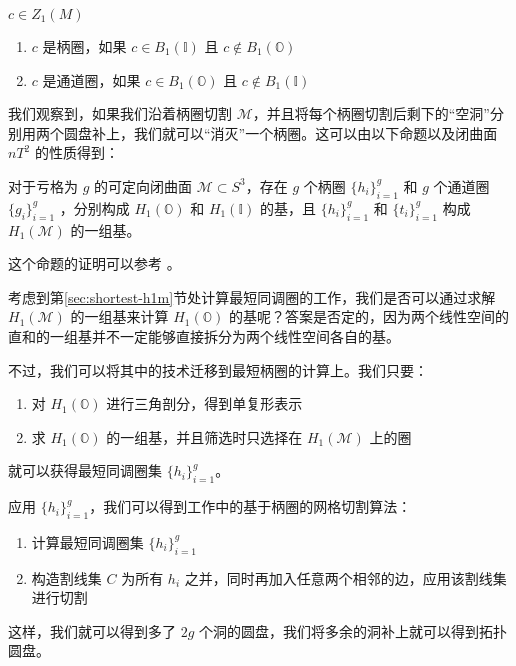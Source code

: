 \begin{definition}
    $ c \in Z_1(M) $
    \begin{enumerate}
        \item $ c $ 是柄圈，如果 $ c \in B_1(\mathbb{I}) $ 且 $ c \notin B_1(\mathbb{O}) $
        \item $ c $ 是通道圈，如果 $ c \in B_1(\mathbb{O}) $ 且 $ c \notin B_1(\mathbb{I}) $
    \end{enumerate}
\end{definition}

我们观察到，如果我们沿着柄圈切割 $ \mathcal{M} $，并且将每个柄圈切割后剩下的“空洞”分别用两个圆盘补上，我们就可以“消灭”一个柄圈。这可以由以下命题以及闭曲面 $ nT^2 $ 的性质得到：

\begin{proposition}
    对于亏格为 $ g $ 的可定向闭曲面 $ \mathcal{M} \subset S^3 $，存在 $ g $ 个柄圈 $ \{h_i\}_{i=1}^{g} $ 和 $ g $ 个通道圈 $ \{g_i\}_{i=1}^{g} $ ，分别构成 $ H_1(\mathbb{O}) $ 和 $ H_1(\mathbb{I}) $ 的基，且 $ \{h_i\}_{i=1}^{g} $ 和 $ \{t_i\}_{i=1}^{g} $ 构成 $ H_1(\mathcal{M}) $ 的一组基。
\end{proposition}

这个命题的证明可以参考 \citet{oncomputinghantun}。

考虑到第\ref{sec:shortest-h1m}节处计算最短同调圈的工作，我们是否可以通过求解 $ H_1(\mathcal{M}) $ 的一组基来计算 $ H_1(\mathbb{O}) $ 的基呢？答案是否定的，因为两个线性空间的直和的一组基并不一定能够直接拆分为两个线性空间各自的基。

不过，我们可以将其中的技术迁移到最短柄圈的计算上。我们只要：
\begin{enumerate}
    \item 对 $ H_1(\mathbb{O}) $ 进行三角剖分，得到单复形表示
    \item 求 $ H_1(\mathbb{O}) $ 的一组基，并且筛选时只选择在 $ H_1(\mathcal{M}) $ 上的圈
\end{enumerate}
就可以获得最短同调圈集 $ \{h_i\}_{i=1}^{g} $。

应用 $ \{h_i\}_{i=1}^{g} $，我们可以得到\citet{ShuangmingChaiThesis}工作中的基于柄圈的网格切割算法：
\begin{enumerate}
    \item 计算最短同调圈集 $ \{h_i\}_{i=1}^{g} $
    \item 构造割线集 $ C $ 为所有 $ h_i $ 之并，同时再加入任意两个相邻的边，应用该割线集进行切割
\end{enumerate}

这样，我们就可以得到多了 $ 2g $ 个洞的圆盘，我们将多余的洞补上就可以得到拓扑圆盘。